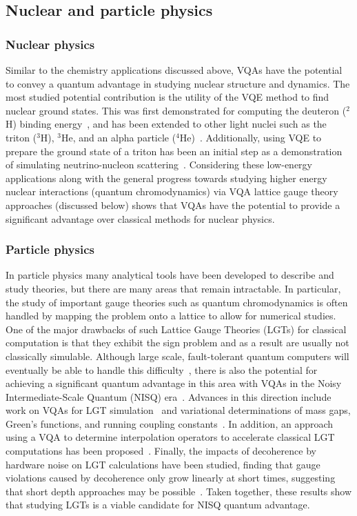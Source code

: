 \documentclass[prx,twocolumn,floatfix,superscriptaddress,longbibliography]{revtex4-1}
\newcommand{\<}{\langle}
\renewcommand{\>}{\rangle}
\begin{document}
\subsection{Nuclear and particle physics}

\subsubsection{Nuclear physics} Similar to the chemistry applications discussed above, VQAs have the potential to convey a quantum advantage in studying nuclear structure and dynamics. The most studied potential contribution is the utility of the VQE method to find nuclear ground states. This was first demonstrated for computing the deuteron ($^2$H) binding energy~\cite{dumitrescu2018cloud}, and has been extended to other light nuclei such as the triton ($^3$H), $^3$He, and an alpha particle ($^4$He)~\cite{lu2019simulations}. Additionally, using VQE to prepare the ground state of a triton has been an initial step as a demonstration of simulating neutrino-nucleon scattering~\cite{roggero2020quantum}. Considering these low-energy applications along with the general progress towards studying higher energy nuclear interactions (quantum chromodynamics) via VQA lattice gauge theory approaches (discussed below) shows that VQAs have the potential to provide a significant advantage over classical methods for nuclear physics.

\subsubsection{Particle physics} In particle physics many analytical tools have been developed to describe and study theories, but there are many areas that remain intractable. In particular, the study of important gauge theories such as quantum chromodynamics is often handled by mapping the problem onto a lattice to allow for numerical studies. One of the major drawbacks of such Lattice Gauge Theories (LGTs) for classical computation is that they exhibit the sign problem and as a result are usually not classically simulable. Although large scale, fault-tolerant quantum computers will eventually be able to handle this difficulty~\cite{bender2018digital,banuls2020simulating}, there is also the potential for achieving a significant quantum advantage in this area with VQAs in the Noisy Intermediate-Scale Quantum (NISQ) era~\cite{preskill2018simulating}. Advances in this direction include work on VQAs for LGT  simulation~\cite{kokail2019self} and variational determinations of mass gaps, Green's functions, and running coupling constants~\cite{endo2020calculation,mishra2020quantum,paulson2020towards}. In addition, an approach using a VQA to determine interpolation operators to accelerate classical LGT computations has been proposed~\cite{avkhadiev2020accelerating}. Finally, the impacts of decoherence by hardware noise on LGT calculations have been studied, finding that gauge violations caused by decoherence only grow linearly at short times, suggesting that short depth approaches may be possible~\cite{halimeh2020fate}. Taken together, these results show that studying LGTs is a viable candidate for NISQ quantum advantage. 
\end{document}
